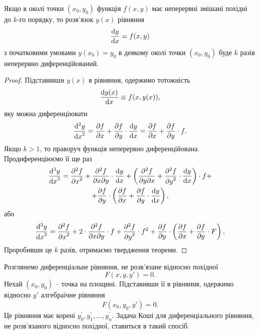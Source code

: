 \begin{theorem}
	Якщо в околі точки $(x_0,y_0)$ функція $f(x,y)$ має неперервні змішані похідні до $k$-го порядку, то розв’язок $y(x)$ рівняння
	\begin{equation}
		\label{eq:1.6.21}
		\frac{\mathop{}\!\mathrm{d} y}{\mathop{}\!\mathrm{d} x} = f(x, y)
	\end{equation}
	з початковими умовами $y(x_0)=y_0$ в деякому околі точки $(x_0,y_0)$ буде $k$ разів неперервно диференційований.
\end{theorem}
\begin{proof} 
	Підставивши $y(x)$ в рівняння, одержимо тотожність
	\begin{equation}
		\label{eq:1.6.22}
		\frac{\mathop{}\!\mathrm{d} y(x)}{\mathop{}\!\mathrm{d} x} \equiv f(x, y(x)),
	\end{equation}
	яку можна диференціювати
	\begin{equation}
		\label{eq:1.6.23}
		\frac{\mathop{}\!\mathrm{d}^2 y}{{\mathop{}\!\mathrm{d} x}^2} = \frac{\partial f}{\partial x} + \frac{\partial f}{\partial y} \cdot \frac{\mathop{}\!\mathrm{d} y}{\mathop{}\!\mathrm{d} x} = \frac{\partial f}{\partial x} + \frac{\partial f}{\partial y} \cdot f.
	\end{equation}
	Якщо $k > 1$, то праворуч функція неперервно диференційована. Продиференціюємо її ще раз
	\begin{multline}
		\label{eq:1.6.24}
		\frac{\diff^3 y}{{\diff x}^3} = \frac{\partial^2 f}{{\partial x}^2} + \frac{\partial^2 f}{\partial x \partial y} \cdot \frac{\diff y}{\diff x} + \left( \frac{\partial^2 f}{\partial y \partial x} + \frac{\partial^2 f}{{\partial y}^2} \cdot \frac{\diff y}{\diff x} \right) \cdot f + \\
		+ \frac{\partial f}{\partial y} \cdot \left( \frac{\partial f}{\partial x} + \frac{\partial f}{\partial y} \cdot \frac{\diff y}{\diff x} \right),
	\end{multline}
	або
	\begin{equation}
		\label{eq:1.6.25}
		\frac{\mathop{}\!\mathrm{d}^3 y}{{\mathop{}\!\mathrm{d} x}^3} = \frac{\partial^2 f}{{\partial x}^2} + 2 \cdot \frac{\partial^2 f}{\partial x \partial y} \cdot f + \frac{\partial^2 f}{{\partial y}^2} \cdot f^2 + \frac{\partial f}{\partial y} \cdot \left( \frac{\partial f}{\partial x} + \frac{\partial f}{\partial y} \cdot F \right),
	\end{equation}
	Проробивши це $k$ разів, отримаємо твердження теореми.
\end{proof}

Розглянемо диференціальне рівняння, не розв’язане відносно похідної
\begin{equation}
	\label{eq:1.6.26}
	F(x, y, y') = 0.
\end{equation}
Нехай $(x_0, y_0)$ -- точка на площині. Підставивши її в рівняння, одержимо відносно $y'$ алгебраїчне рівняння
\begin{equation}
	\label{eq:1.6.27}
	F(x_0, y_0, y') = 0.
\end{equation}
Це рівняння має корені $y_0^\prime, y_1^\prime, \ldots, y_n^\prime$. Задача Коші для диференціального рівняння, не розв’язаного відносно похідної, ставиться в такий спосіб. \\

